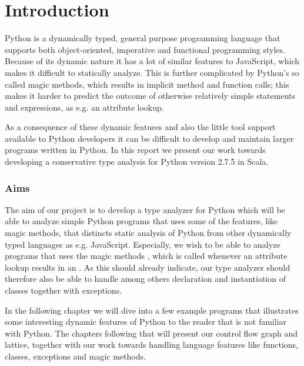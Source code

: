 \chapter{Introduction}
Python is a dynamically typed, general purpose programming language that supports both object-oriented, imperative and functional programming styles. Because of its dynamic nature it has a lot of similar features to JavaScript, which makes it difficult to statically analyze. This is further complicated by Python's so called magic methods, which results in implicit method and function calls; this makes it harder to predict the outcome of otherwise relatively simple statements and expressions, as e.g. an attribute lookup.

As a consequence of these dynamic features and also the little tool support available to Python developers it can be difficult to develop and maintain larger programs written in Python. In this report we present our work towards developing a conservative type analysis for Python version 2.7.5 in Scala.

\subsection{Aims}
The aim of our project is to develop a type analyzer for Python which will be able to analyze simple Python programs that uses some of the features, like magic methods, that distincts static analysis of Python from other dynamically typed languages as e.g. JavaScript. Especially, we wish to be able to analyze programs that uses the magic methods , which is called whenever an attribute lookup results in an . As this should already indicate, our type analyzer should therefore also be able to handle among others declaration and instantiation of classes together with exceptions.

In the following chapter we will dive into a few example programs that illustrates some interesting dynamic features of Python to the reader that is not familiar with Python. The chapters following that will present our control flow graph and lattice, together with our work towards handling language features like functions, classes, exceptions and magic methods.